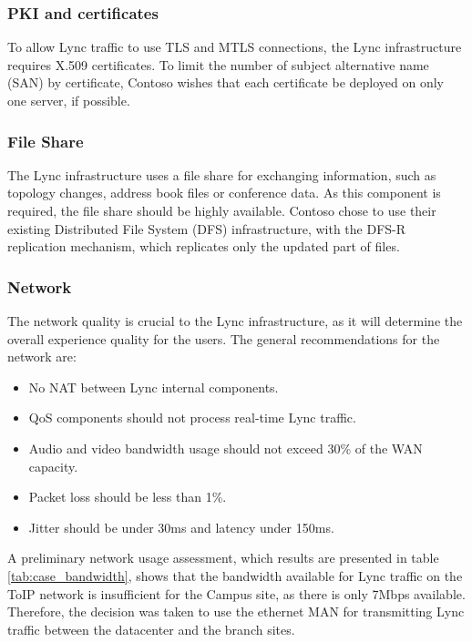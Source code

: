 	\subsubsection{PKI and certificates}
		To allow Lync traffic to use TLS and MTLS connections, the Lync infrastructure requires X.509 certificates.	To limit the number of subject alternative name (SAN) by certificate, Contoso wishes that each certificate be deployed on only one server, if possible.
		
	\subsubsection{File Share}
		The Lync infrastructure uses a file share for exchanging information, such as topology changes, address book files or conference data. As this component is required, the file share should be highly available. Contoso chose to use their existing Distributed File System (DFS) infrastructure, with the DFS-R replication mechanism, which replicates only the updated part of files.
		
		
	\subsubsection{Network}
		The network quality is crucial to the Lync infrastructure, as it will determine the overall experience quality for the users. The general recommendations for the network are:
		\begin{itemize}
			\item No NAT between Lync internal components.
			\item QoS components should not process real-time Lync traffic.
			\item Audio and video bandwidth usage should not exceed 30\% of the WAN capacity.
			\item Packet loss should be less than 1\%.
			\item Jitter should be under 30ms and latency under 150ms.
		\end{itemize}
		
		A preliminary network usage assessment, which results are presented in table \ref{tab:case_bandwidth}, shows that the bandwidth available for Lync traffic on the ToIP network is insufficient for the Campus site, as there is only 7Mbps available. Therefore, the decision was taken to use the ethernet MAN for transmitting Lync traffic between the datacenter and the branch sites.
		
